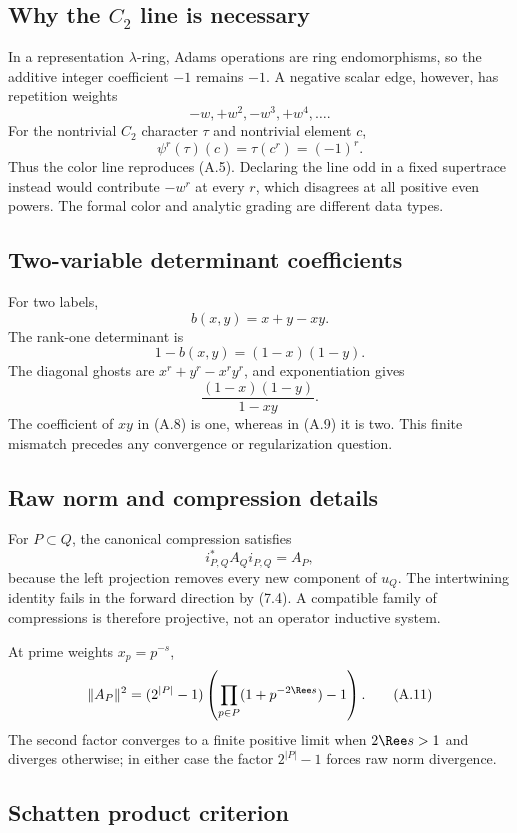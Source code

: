 \subsection{Why the \texorpdfstring{$C_2$}{C2} line is necessary}

In a representation $\lambda$-ring, Adams operations are ring endomorphisms,
so the additive integer coefficient $-1$ remains $-1$.  A negative scalar
edge, however, has repetition weights
\[
  -w,+w^2,-w^3,+w^4,\ldots.
  \tag{A.5}
\]
For the nontrivial $C_2$ character $\tau$ and nontrivial element $c$,
\[
  \psi^r(\tau)(c)=\tau(c^r)=(-1)^r.
  \tag{A.6}
\]
Thus the color line reproduces (A.5).  Declaring the line odd in a fixed
supertrace instead would contribute $-w^r$ at every $r$, which disagrees at
all positive even powers.  The formal color and analytic grading are
different data types.

\subsection{Two-variable determinant coefficients}

For two labels,
\[
 b(x,y)=x+y-xy.
 \tag{A.7}
\]
The rank-one determinant is
\[
 1-b(x,y)=(1-x)(1-y).
 \tag{A.8}
\]
The diagonal ghosts are $x^r+y^r-x^ry^r$, and exponentiation gives
\[
 \frac{(1-x)(1-y)}{1-xy}.
 \tag{A.9}
\]
The coefficient of $xy$ in (A.8) is one, whereas in (A.9) it is two.  This
finite mismatch precedes any convergence or regularization question.

\subsection{Raw norm and compression details}

For $P\subset Q$, the canonical compression satisfies
\[
 i_{P,Q}^*A_Qi_{P,Q}=A_P,
 \tag{A.10}
\]
because the left projection removes every new component of $u_Q$.  The
intertwining identity fails in the forward direction by (7.4).  A compatible
family of compressions is therefore projective, not an operator inductive
system.

At prime weights $x_p=p^{-s}$,
\[
 \|A_P\|^2
 =(2^{|P|}-1)
  \left(\prod_{p\in P}(1+p^{-2\Ree s})-1\right).
 \tag{A.11}
\]
The second factor converges to a finite positive limit when
$2\Ree s>1$ and diverges otherwise; in either case the factor
$2^{|P|}-1$ forces raw norm divergence.

\subsection{Schatten product criterion}

